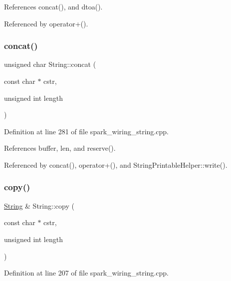 References concat(), and dtoa().



Referenced by operator+().

\mbox{\label{class_string_aba57d3370c8e6abc90b359d62ecb6be6}} 
\subsubsection{\texorpdfstring{concat()}{concat()}\hspace{0.1cm}{\footnotesize\ttfamily [12/12]}}
{\footnotesize\ttfamily unsigned char String\+::concat (\begin{DoxyParamCaption}\item[{const char $\ast$}]{cstr,  }\item[{unsigned int}]{length }\end{DoxyParamCaption})\hspace{0.3cm}{\ttfamily [protected]}}



Definition at line 281 of file spark\+\_\+wiring\+\_\+string.\+cpp.



References buffer, len, and reserve().



Referenced by concat(), operator+(), and String\+Printable\+Helper\+::write().

\mbox{\label{class_string_af425a88dd132c147a97d8eca4df2be35}} 
\subsubsection{\texorpdfstring{copy()}{copy()}\hspace{0.1cm}{\footnotesize\ttfamily [1/2]}}
{\footnotesize\ttfamily \hyperlink{class_string}{String} \& String\+::copy (\begin{DoxyParamCaption}\item[{const char $\ast$}]{cstr,  }\item[{unsigned int}]{length }\end{DoxyParamCaption})\hspace{0.3cm}{\ttfamily [protected]}}



Definition at line 207 of file spark\+\_\+wiring\+\_\+string.\+cpp.



